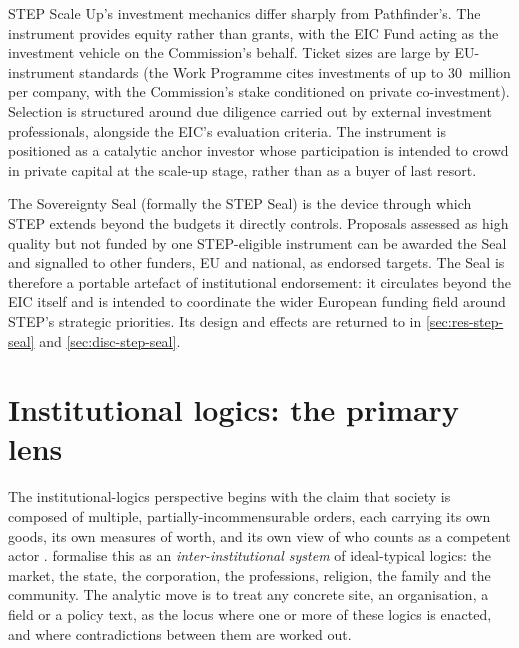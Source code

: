 STEP Scale Up's investment mechanics differ sharply from Pathfinder's.
The instrument provides equity rather than grants, with the EIC Fund
acting as the investment vehicle on the Commission's behalf. Ticket
sizes are large by EU-instrument standards (the Work Programme cites
investments of up to \texteuro{}30~million per company, with the
Commission's stake conditioned on private co-investment). Selection
is structured around due diligence carried out by external
investment professionals, alongside the EIC's evaluation criteria.
The instrument is positioned as a catalytic anchor investor whose
participation is intended to crowd in private capital at the scale-up
stage, rather than as a buyer of last resort.

The Sovereignty Seal (formally the STEP Seal) is the device through
which STEP extends beyond the budgets it directly controls. Proposals
assessed as high quality but not funded by one STEP-eligible
instrument can be awarded the Seal and signalled to other funders, EU
and national, as endorsed targets. The Seal is therefore a portable
artefact of institutional endorsement: it circulates beyond the EIC
itself and is intended to coordinate the wider European funding
field around STEP's strategic priorities. Its design and effects are
returned to in \cref{sec:res-step-seal} and \cref{sec:disc-step-seal}.

\section{Institutional logics: the primary lens}
\label{sec:bg-it-logics}

The institutional-logics perspective begins with the claim that
society is composed of multiple, partially-incommensurable orders,
each carrying its own goods, its own measures of worth, and its own
view of who counts as a competent actor \parencite{friedland1991bringing}.
\textcite{thornton2012institutional} formalise this as an
\emph{inter-institutional system} of ideal-typical logics: the market,
the state, the corporation, the professions, religion, the family and
the community. The analytic move is to treat any concrete site, an
organisation, a field or a policy text, as the locus where one or more
of these logics is enacted, and where contradictions between them are
worked out.

